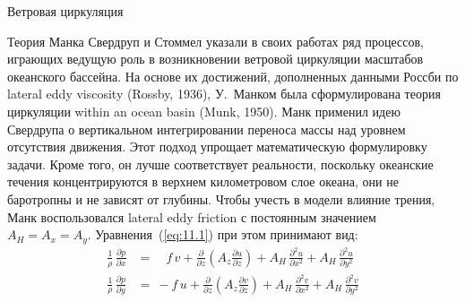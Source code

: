 \begin{chapter}{Ветровая циркуляция}
\begin{section}{Теория Манка}\label{sec:MunksSolution}
Свердруп и Стоммел указали в своих работах ряд процессов,
играющих ведущую роль в возникновении ветровой циркуляции масштабов океанского
бассейна. На основе их достижений, дополненных данными Россби по 
lateral eddy viscosity (Rossby, 1936), У.~Манком была сформулирована теория
циркуляции within an ocean basin (Munk, 1950).
Манк применил идею Свердрупа о вертикальном интегрировании переноса
массы над уровнем отсутствия движения. Этот подход упрощает математическую 
формулировку задачи. Кроме того, он лучше соответствует реальности, поскольку
океанские течения концентрируются в верхнем километровом слое океана, они
не баротропны и не зависят от глубины. Чтобы учесть в модели влияние трения,
Манк воспользовался lateral eddy friction с постоянным 
значением~$A_H = A_x = A_y$. Уравнения~(\ref{eq:11.1}) при этом принимают вид:
\begin{subequations}
\begin{align}
\frac{1}{\rho}\, \frac{\partial{p}}{\partial{x}}
   &=\quad f \,v+\frac{\partial}{\partial{z}}\left(A_z\frac{\partial{u}}{\partial{z}}\right) 
      + A_H\,\frac{\partial^2{u}}{\partial{x}^2} 
      + A_H\,\frac{\partial^2{u}}{\partial{y}^2} \label{eq:11.17a}\\
\frac{1}{\rho}\, \frac{\partial{p}}{\partial{y}} 
   &=\:-f \,u+\frac{\partial}{\partial{z}}\left(A_z\frac{\partial{v}}{\partial{z}}\right) 
      + A_H\,\frac{\partial^2{v}}{\partial{x}^2} 
      + A_H\,\frac{\partial^2{v}}{\partial{y}^2} \label{eq:11.17b}
\end{align}
\end{subequations}
%

\end{section}
\end{chapter}
